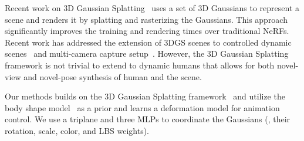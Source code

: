 Recent work on 3D Gaussian Splatting~\cite{kerbl3Dgaussians} uses a set of 3D Gaussians to represent a scene and renders it by splatting and rasterizing the Gaussians. This approach significantly improves the training and rendering times over traditional NeRFs. Recent work has addressed the extension of 3DGS scenes to controlled dynamic scenes~\cite{wu20234dgs} and multi-camera capture setup~\cite{luiten2023dynamicgs}. However, the 3D Gaussian Splatting framework is not trivial to extend to dynamic humans that allows for both novel-view and novel-pose synthesis of human and the scene.

Our methods builds on the 3D Gaussian Splatting framework~\cite{kerbl3Dgaussians} and utilize the \smpl body shape model~\cite{SMPL:2015} as a prior and learns a deformation model for animation control. 
We use a triplane and three MLPs to coordinate the Gaussians (\eg, their rotation, scale, color, and LBS weights). 
%





